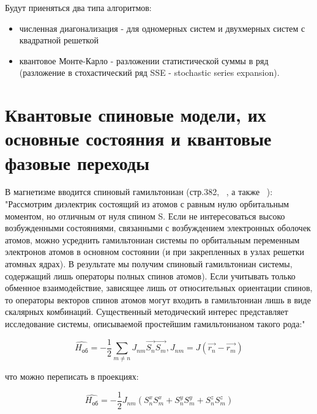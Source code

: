 \documentclass[11pt]{article}
\begin{document}
Будут приеняться два типа алгоритмов: 
\begin{itemize}
	\item численная диагонализация - для одномерных систем и двухмерных систем с квадратной решеткой
	\item квантовое Монте-Карло - разложении статистической суммы в ряд (разложение в стохастический ряд SSE - stochastic series expansion).
\end{itemize}

\section{Квантовые спиновые модели, их основные состояния и квантовые фазовые переходы}
В магнетизме вводится спиновый гамильтониан (стр.382, ~\cite{ll_9}, а также ~\cite{prb_115_2, Mattis, prb_79_235130}):
"Рассмотрим диэлектрик состоящий из атомов с равным нулю орбитальным моментом, но отличным от нуля спином S. Если не интересоваться высоко возбужденными состояниями, связанными с возбуждением электронных оболочек атомов, можно
усреднить гамильтониан системы по орбитальным переменным электронов атомов в основном состоянии (и при закрепленных в узлах решетки атомных ядрах). В результате мы получим спиновый гамильтониан системы, содержащий лишь операторы полных спинов атомов). Если учитывать только обменное взаимодействие, зависящее лишь от относительных ориентации спинов, то операторы векторов спинов атомов могут входить в гамильтониан лишь в виде скалярных комбинаций. Существенный методический интерес представляет исследование системы, описываемой простейшим гамильтонианом такого рода:"


\begin{equation}
\hat{ H_\textrm{об}} = -\frac{1}{2} \sum\limits_{m \ne n}{ J_{nm}\vec{S_n}\vec{S_m}} , J_{nm}=J(\vec{r_n}-\vec{r_m})
\label{eq_1}
\end{equation}

что можно переписать в проекциях:

\begin{equation*}
\hat{ H_\textrm{об}} = -\frac{1}{2} J_{nm}(S_n^xS_m^x+S_n^yS_m^y+S_n^zS_m^z)
\end{equation*}
\end{document}
